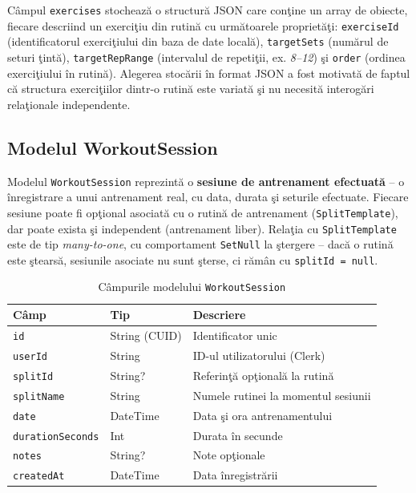 C\^ ampul \texttt{exercises} stocheaz\u a o structur\u a JSON care
con\c tine un array de obiecte, fiecare descriind un exerci\c tiu
din rutin\u a cu urm\u atoarele propriet\u a\c ti:
\texttt{exerciseId} (identificatorul exerci\c tiului din baza de
date local\u a), \texttt{targetSets} (num\u arul de seturi
\c tint\u a), \texttt{targetRepRange} (intervalul de repeti\c tii,
ex. \textit{8--12}) \c si \texttt{order} (ordinea exerci\c tiului
\^ in rutin\u a). Alegerea stoc\u arii \^ in format JSON a fost
motivat\u a de faptul c\u a structura exerci\c tiilor dintr-o
rutin\u a este variat\u a \c si nu necesit\u a interog\u ari
rela\c tionale independente.

\subsection{Modelul WorkoutSession}

Modelul \texttt{WorkoutSession} reprezint\u a o \textbf{sesiune de
antrenament efectuat\u a} -- o \^ inregistrare a unui antrenament
real, cu data, durata \c si seturile efectuate. Fiecare sesiune
poate fi op\c tional asociat\u a cu o rutin\u a de antrenament
(\texttt{SplitTemplate}), dar poate exista \c si independent
(antrenament liber). Rela\c tia cu \texttt{SplitTemplate} este
de tip \textit{many-to-one}, cu comportament \texttt{SetNull}
la \c stergere -- dac\u a o rutin\u a este \c stears\u a,
sesiunile asociate nu sunt \c sterse, ci r\u am\^ an cu
\texttt{splitId = null}.

\begin{table}[htbp]
\centering
\caption{C\^ ampurile modelului \texttt{WorkoutSession}}
\label{tab:session}
\begin{tabular}{|l|l|l|}
\hline
\textbf{C\^ amp} & \textbf{Tip} & \textbf{Descriere} \\
\hline
\texttt{id}              & String (CUID) & Identificator unic \\
\texttt{userId}          & String        & ID-ul utilizatorului (Clerk) \\
\texttt{splitId}         & String?       & Referin\c t\u a op\c tional\u a la rutin\u a \\
\texttt{splitName}       & String        & Numele rutinei la momentul sesiunii \\
\texttt{date}            & DateTime      & Data \c si ora antrenamentului \\
\texttt{durationSeconds} & Int           & Durata \^ in secunde \\
\texttt{notes}           & String?       & Note op\c tionale \\
\texttt{createdAt}       & DateTime      & Data \^ inregistr\u arii \\
\hline
\end{tabular}
\end{table}

